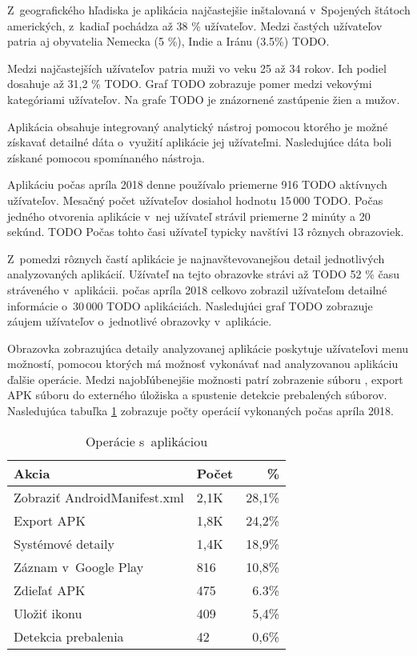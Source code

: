 Z~geografického hľadiska je aplikácia najčastejšie inštalovaná v~Spojených štátoch amerických, z~kadiaľ pochádza až 38 \% užívateľov. Medzi častých užívateľov patria aj obyvatelia Nemecka (5 \%), Indie a Iránu (3.5\%) TODO. 

Medzi najčastejších užívateľov patria muži vo veku 25 až 34 rokov. Ich podiel dosahuje až 31,2 \% TODO. Graf TODO zobrazuje pomer medzi vekovými kategóriami užívateľov. Na grafe TODO je znázornené zastúpenie žien a mužov.

Aplikácia obsahuje integrovaný analytický nástroj  pomocou ktorého je možné získavať detailné dáta o~využití aplikácie jej užívateľmi. Nasledujúce dáta boli získané pomocou spomínaného nástroja.

Aplikáciu počas apríla 2018 denne používalo priemerne 916 TODO aktívnych užívateľov. Mesačný počet užívateľov dosiahol hodnotu 15\,000 TODO. Počas jedného otvorenia aplikácie v~nej užívateľ strávil priemerne 2 minúty a 20 sekúnd. TODO Počas tohto časi užívateľ typicky navštívi 13 rôznych obrazoviek. 

Z~pomedzi rôznych častí aplikácie je najnavštevovanejšou detail jednotlivých analyzovaných aplikácií. Užívateľ na tejto obrazovke strávi až TODO 52 \% času stráveného v~aplikácii.  počas apríla 2018 celkovo zobrazil užívateľom detailné informácie o~30\,000 TODO aplikáciách.  Nasledujúci graf TODO zobrazuje záujem užívateľov o~jednotlivé obrazovky v~aplikácie.

Obrazovka zobrazujúca detaily analyzovanej aplikácie poskytuje užívateľovi menu možností, pomocou ktorých má možnosť vykonávať nad analyzovanou aplikáciu ďalšie operácie. Medzi najobľúbenejšie možnosti patrí zobrazenie súboru , export APK súboru do externého úložiska a spustenie detekcie prebalených súborov.  Nasledujúca tabuľka \ref{app-ops} zobrazuje počty operácií vykonaných počas apríla 2018.

\begin{table}[]
\centering
\begin{tabular}{|l|l|r|}
\hline
\textbf{Akcia}                        & \textbf{Počet} & \textbf{\%}    \\ \hline
Zobraziť AndroidManifest.xml & 2,1K  & 28,1\% \\
Export APK                   & 1,8K  & 24,2\% \\
Systémové detaily            & 1,4K  & 18,9\% \\
Záznam v~Google Play         & 816   & 10,8\% \\
Zdieľať APK                  & 475   & 6.3\%  \\
Uložiť ikonu                 & 409   & 5,4\%  \\
Detekcia prebalenia          & 42    & 0,6\%  \\ \hline
\end{tabular}
\caption{Operácie s~aplikáciou}
\label{app-ops}
\end{table}



